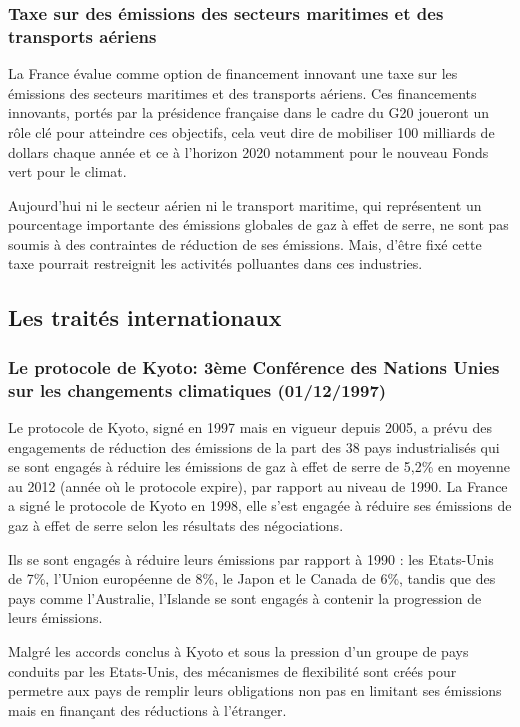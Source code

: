 \documentclass[a4paper,11pt]{article}
\begin{document}
\subsubsection{Taxe sur des émissions des secteurs maritimes et des transports aériens}

La France évalue comme option de financement innovant une taxe sur les émissions
des secteurs  maritimes et des  transports aériens. Ces  financements innovants,
portés par  la présidence française  dans le cadre  du G20 joueront un  rôle clé
pour  atteindre ces  objectifs, cela  veut dire  de mobiliser  100  milliards de
dollars chaque année et ce à l’horizon 2020 notamment pour le nouveau Fonds vert
pour le climat.


Aujourd'hui ni le  secteur aérien ni le transport  maritime, qui représentent un
pourcentage importante des  émissions globales de gaz à effet  de serre, ne sont
pas soumis  à des contraintes de  réduction de ses émissions.  Mais, d’être fixé
cette taxe pourrait restreignit les activités polluantes dans ces industries.


\subsection{Les traités internationaux}

\subsubsection[Le protocole de Kyoto]{Le protocole de Kyoto: 3ème Conférence des Nations Unies sur les changements climatiques  (01/12/1997)}

Le protocole de  Kyoto, signé en 1997  mais en vigueur depuis 2005,  a prévu des
engagements de réduction des émissions de la part des 38 pays industrialisés qui
se sont  engagés à réduire  les émissions de  gaz à effet  de serre de  5,2\% en
moyenne  au 2012  (année  où le  protocole  expire), par  rapport  au niveau  de
1990. La  France a signé  le protocole  de Kyoto en  1998, elle s’est  engagée à
réduire  ses  émissions  de  gaz  à  effet de  serre  selon  les  résultats  des
négociations.


Ils  se  sont engagés  à  réduire  leurs émissions  par  rapport  à  1990 :  les
Etats-Unis de  7\%, l’Union  européenne de 8\%,  le Japon  et le Canada  de 6\%,
tandis que des  pays comme l’Australie, l’Islande se sont  engagés à contenir la
progression de leurs émissions.


Malgré  les accords conclus  à Kyoto  et sous  la pression  d'un groupe  de pays
conduits  par les  Etats-Unis, des  mécanismes  de flexibilité  sont créés  pour
permetre aux pays de remplir leurs obligations non pas en limitant ses émissions
mais en finançant des réductions à l'étranger. 
\end{document}
